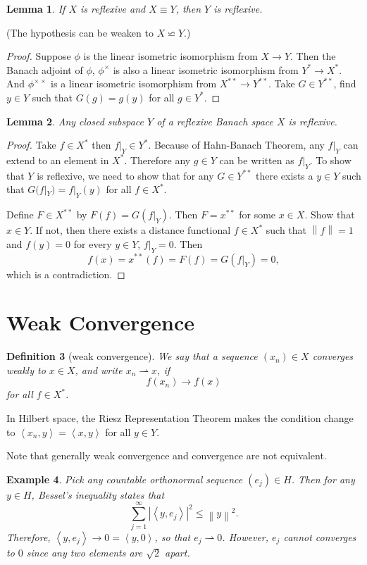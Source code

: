\documentclass[12pt,a4paper]{report}
\numberwithin{equation}{section}
\theoremstyle{mystyle}
\newtheorem{definition}{Definition}[section]
\newtheorem{lemma}[definition]{Lemma}
\newtheorem{example}[definition]{Example}
\newcommand{\norm}[1]{\left\lVert #1 \right\rVert}
\newcommand{\inner}[1]{\left\langle #1 \right\rangle}
\begin{document}
	\begin{lemma}
		If $X$ is reflexive and $X\equiv Y$, then $Y$ is reflexive.
	\end{lemma}
	(The hypothesis can be weaken to $X\backsimeq Y$.)
	\begin{proof}
		Suppose $\phi$ is the linear isometric isomorphism from $X\to Y$. Then the Banach adjoint of $\phi$, $\phi^\times$ is also a linear isometric isomorphism from $Y^*\to X^*$. And $\phi^{\times \times}$ is a linear isometric isomorphism from $X^{**}\to Y^{**}$. Take $G\in Y^{**}$, find $y\in Y$ such that $G(g)=g(y)$ for all $g\in Y^*$.
	\end{proof}
	
	\begin{lemma}
		Any closed subspace $Y$ of a reflexive Banach space $X$ is reflexive.
	\end{lemma}
	\begin{proof}
		Take $f\in X^*$ then $f|_Y\in Y^*$. Because of Hahn-Banach Theorem, any $f|_Y$ can extend to an element in $X^*$. Therefore any $g\in Y$ can be written as $f|_Y$. To show that $Y$ is reflexive, we need to show that for any $G\in Y^{**}$ there exists a $y\in Y$ such that $G(f|_Y)=f|_Y(y)$ for all $f\in X^*$.
		
		Define $F\in X^{**}$ by $F(f)=G(f|_Y)$. Then $F=x^{**}$ for some $x\in X$. Show that $x\in Y$. If not, then there exists a distance functional $f\in X^*$ such that $\norm{f}=1$ and $f(y)=0$ for every $y\in Y$, $f|_Y=0$. Then
		$$
		f(x)=x^{**}(f)=F(f)=G(f|_Y)=0,
		$$
		which is a contradiction.
	\end{proof}
	
	
	\newcommand{\weakto}{\rightharpoonup}
	\section{Weak Convergence}
	\begin{definition}[weak convergence]
		We say that a sequence $(x_n)\in X$ converges weakly to $x\in X$, and write $x_n\weakto x$, if
		$$
		f(x_n)\to f(x)
		$$
		for all $f\in X^*$.
	\end{definition}
	In Hilbert space, the Riesz Representation Theorem makes the condition change to $\inner{x_n,y}=\inner{x,y}$ for all $y\in Y$.
	
	Note that generally weak convergence and convergence are not equivalent.
	\begin{example}
		Pick any countable orthonormal sequence $(e_j)\in H$. Then for any $y\in H$, Bessel's inequality states that 
		$$
		\sum_{j=1}^\infty |\inner{y,e_j}|^2\leq \norm{y}^2.
		$$
		Therefore, $\inner{y,e_j}\to 0=\inner{y,0}$, so that $e_j\weakto 0$. However, $e_j$ cannot converges to $0$ since any two elements are $\sqrt{2}$ apart.
	\end{example}
	
\end{document}

